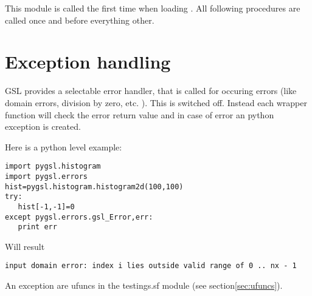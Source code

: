 
This module is called the first time when loading .
All following procedures are called once and before everything other.

\section{Exception handling}
 GSL provides a selectable error
handler, that is called for occuring errors (like domain errors, division by
zero, etc. ).  This is switched off. Instead each wrapper function will check
the error return value and in case of error an python exception is created. 

Here is a python level example:
\begin{verbatim}
import pygsl.histogram
import pygsl.errors
hist=pygsl.histogram.histogram2d(100,100)
try:
   hist[-1,-1]=0
except pygsl.errors.gsl_Error,err:
   print err
\end{verbatim}
Will result
\begin{verbatim}
input domain error: index i lies outside valid range of 0 .. nx - 1
\end{verbatim}


An exception are ufuncs in the testings.sf module (see section\ref{sec:ufuncs}).

%
%
% 
% 
% 

